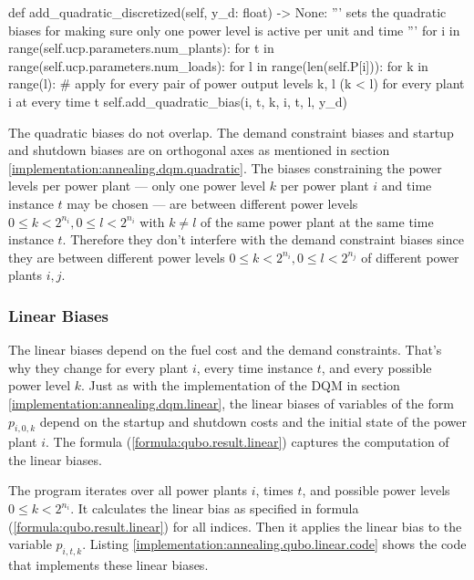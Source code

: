 \begin{python}[
  float,
  caption={Implementation of the Quadratic Discretization Biases for QUBOs},
  label={implementation:annealing.qubo.quadratic.discretization.code}
]
  def add_quadratic_discretized(self, y_d: float) -> None:
    '''
    sets the quadratic biases for making sure only one power level is active per unit and time
    '''
    for i in range(self.ucp.parameters.num_plants):
      for t in range(self.ucp.parameters.num_loads):
        for l in range(len(self.P[i])):
          for k in range(l):
            # apply for every pair of power output levels k, l (k < l) for every plant i at every time t
            self.add_quadratic_bias(i, t, k, i, t, l, y_d)
\end{python}

The quadratic biases do not overlap.
The demand constraint biases and startup and shutdown biases are on orthogonal axes as mentioned in section \ref{implementation:annealing.dqm.quadratic}.
The biases constraining the power levels per power plant --- only one power level $k$ per power plant $i$ and time instance $t$ may be chosen --- are between different power levels $0 \leq k < 2^{n_i}, 0 \leq l < 2^{n_i}$ with $k \neq l$ of the same power plant at the same time instance $t$.
Therefore they don't interfere with the demand constraint biases since they are between different power levels $0 \leq k < 2^{n_i}, 0 \leq l < 2^{n_j}$ of different power plants $i, j$.

\subsubsection{Linear Biases}
\label{implementation:annealing.qubo.linear}

The linear biases depend on the fuel cost and the demand constraints.
That's why they change for every plant $i$, every time instance $t$, and every possible power level $k$.
Just as with the implementation of the DQM in section \ref{implementation:annealing.dqm.linear}, the linear biases of variables of the form $p_{i, 0, k}$ depend on the startup and shutdown costs and the initial state of the power plant $i$.
The formula (\ref{formula:qubo.result.linear}) captures the computation of the linear biases.

The program iterates over all power plants $i$, times $t$, and possible power levels $0 \leq k < 2^{n_i}$.
It calculates the linear bias as specified in formula (\ref{formula:qubo.result.linear}) for all indices.
Then it applies the linear bias to the variable $p_{i, t, k}$.
Listing \ref{implementation:annealing.qubo.linear.code} shows the code that implements these linear biases.

